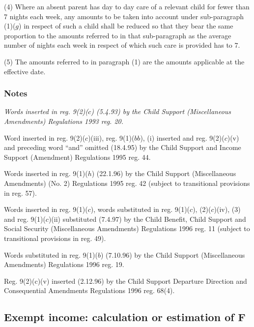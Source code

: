\documentclass[a4paper]{article}
\newcommand\amendment[1]{\subsubsection*{Notes}{\itshape\frenchspacing\footnotesize #1 \par\goodbreak}}
\begin{document}
(4) Where an absent parent has day to day care of a relevant child for fewer than 7 nights each week, any amounts to be taken into account under sub-paragraph (1)($g$) in respect of such a child shall be reduced so that they bear the same proportion to the amounts referred to in that sub-paragraph as the average number of nights each week in respect of which such care is provided has to 7.

(5) The amounts referred to in paragraph (1) are the amounts applicable at the effective date.

\amendment{
Words inserted in reg. 9(2)($c$) (5.4.93) by the Child Support (Miscellaneous Amendments) Regulations 1993 reg. 20.

Word inserted in reg. 9(2)($c$)(iii), reg. 9(1)($bb$), (i) inserted and reg. 9(2)($c$)(v) and preceding word ``and'' omitted (18.4.95) by the Child Support and Income Support (Amendment) Regulations 1995 reg. 44.

Words inserted in reg. 9(1)($h$) (22.1.96) by the Child Support (Miscellaneous Amendments) (No. 2) Regulations 1995 reg. 42 (subject to transitional provisions in reg. 57).

Words inserted in reg. 9(1)($c$), words substituted in reg. 9(1)($c$), (2)($c$)(iv), (3) and reg. 9(1)($c$)(ii) substituted (7.4.97) by the Child Benefit, Child Support and Social Security (Miscellaneous Amendments) Regulations 1996 reg. 11 (subject to transitional provisions in reg. 49).

Words substituted in reg. 9(1)($b$) (7.10.96) by the Child Support (Miscellaneous Amendments) Regulations 1996 reg. 19.

Reg. 9(2)(c)(v) inserted (2.12.96) by the Child Support Departure Direction and Consequential Amendments Regulations 1996 reg. 68(4).
}

\subsection[10. Exempt income: calculation or estimation of F]{Exempt income: calculation or estimation of F}
\end{document}
